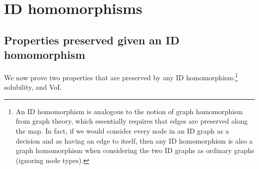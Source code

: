 \section{ID homomorphisms} \label{sec:CID-homomorphisms}
\subsection{Properties preserved given an ID homomorphism} \label{sec:properties-preserved-proofs}


We now prove two
properties that are preserved by any ID homomorphism:\footnote{An ID homomorphism is analogous to the notion of graph homomorphism from graph theory, which essentially requires that edges are preserved along the map. 
In fact, if we would consider every node in an ID graph as a decision and as having an edge to itself, then any ID homomorphism is also a graph homomorphism when considering the two ID graphs as ordinary graphs (ignoring node types).}
solubility, and VoI.~

\lecidhomsufficientrecall*

